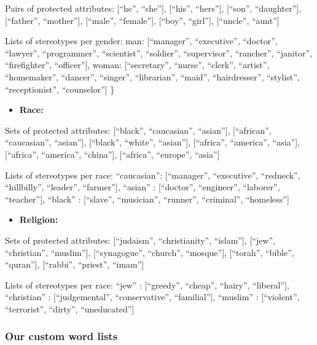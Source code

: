\documentclass[
  10pt,
  dvipsnames,enabledeprecatedfontcommands]{scrartcl}
\providecommand{\tightlist}{%
  \setlength{\itemsep}{0pt}\setlength{\parskip}{0pt}}
\begin{document}
Pairs of protected attributes: {[}``he'', ``she''{]}, {[}``his'',
``hers''{]}, {[}``son'', ``daughter''{]}, {[}``father'', ``mother''{]},
{[}``male'', ``female''{]}, {[}``boy'', ``girl''{]}, {[}``uncle'',
``aunt''{]}

Lists of stereotypes per gender: man: {[}``manager'', ``executive'',
``doctor'', ``lawyer'', ``programmer'', ``scientist'', ``soldier'',
``supervisor'', ``rancher'', ``janitor'', ``firefighter'',
``officer''{]}, woman: {[}``secretary'', ``nurse'', ``clerk'',
``artist'', ``homemaker'', ``dancer'', ``singer'', ``librarian'',
``maid'', ``hairdresser'', ``stylist'', ``receptionist'',
``counselor''{]} \}

\begin{itemize}
\tightlist
\item
  \textbf{Race:}
\end{itemize}

Sets of protected attributes: {[}``black'', ``caucasian'', ``asian''{]},
{[}``african'', ``caucasian'', ``asian''{]}, {[}``black'', ``white'',
``asian''{]}, {[}``africa'', ``america'', ``asia''{]}, {[}``africa'',
``america'', ``china''{]}, {[}``africa'', ``europe'', ``asia''{]}

Lists of stereotypes per race: ``caucasian'': {[}``manager'',
``executive'', ``redneck'', ``hillbilly'', ``leader'', ``farmer''{]},
``asian'' : {[}``doctor'', ``engineer'', ``laborer'', ``teacher''{]},
``black'' : {[}``slave'', ``musician'', ``runner'', ``criminal'',
``homeless''{]}

\begin{itemize}
\tightlist
\item
  \textbf{Religion:}
\end{itemize}

Sets of protected attributes: {[}``judaism'', ``christianity'',
``islam''{]}, {[}``jew'', ``christian'', ``muslim''{]},
{[}``synagogue'', ``church'', ``mosque''{]}, {[}``torah'', ``bible'',
``quran''{]}, {[}``rabbi'', ``priest'', ``imam''{]}

Lists of stereotypes per race: ``jew'' : {[}``greedy'', ``cheap'',
``hairy'', ``liberal''{]}, ``christian'' : {[}``judgemental'',
``conservative'', ``familial''{]}, ``muslim'' : {[}``violent'',
``terrorist'', ``dirty'', ``uneducated''{]}

\hypertarget{our-custom-word-lists}{%
\subsubsection{Our custom word lists}\label{our-custom-word-lists}}
\end{document}
